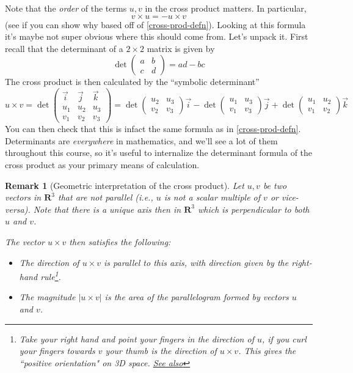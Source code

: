 \documentclass[12pt]{article}
\numberwithin{equation}{subsection}
\numberwithin{figure}{subsection}
\theoremstyle{note}
\newtheorem{remark}[subsection]{Remark}
\begin{document}
{Note that the \textit{order} of the terms $u,v$ in the cross product matters. In particular, \[ v\times u=- u \times v\] (see if you can show why based off of \eqref{cross-prod-defn}). Looking at this formula it's maybe not super obvious where this should come from. Let's unpack it. First recall that the determinant of a $2\times 2$ matrix is given by \[ \det\begin{pmatrix} a & b \\ c & d\end{pmatrix} =ad-bc\] The cross product is then calculated by the ``symbolic determinant'' \begin{equation} u\times v= \det \begin{pmatrix} \vec{i} & \vec{j} & \vec{k} \\ u_1 & u_2 & u_3 \\ v_1 & v_2 & v_3 \end{pmatrix} = 
\det\begin{pmatrix} u_2 & u_3 \\ v_2 & v_3 \end{pmatrix} \vec{i} 
- \det \begin{pmatrix} u_1 & u_3 \\ v_1 & v_3 \end{pmatrix} \vec{j} 
+ \det \begin{pmatrix} u_1 & u_2 \\ v_1 & v_2 \end{pmatrix} \vec{k} \end{equation}
You can then check that this is infact the same formula as in \eqref{cross-prod-defn}. Determinants are \textit{everywhere} in mathematics, and we'll see a lot of them throughout this course, so it's useful to internalize the determinant formula of the cross product as your primary means of calculation.

\begin{remark}[Geometric interpretation of the cross product]
Let $u,v$ be two vectors in $\mathbf{R}^3$ that are not parallel (i.e., $u$ is not a scalar multiple of $v$ or vice-versa). Note that there is a unique axis then in $\mathbf{R}^3$ which is perpendicular to both $u$ and $v$. 



The vector $u\times v$ then satisfies the following: 
\begin{itemize}
\item The direction of  $u\times v$ is parallel to this axis, with direction given by the \textit{right-hand rule}\footnote{Take your right hand and point your fingers in the direction of $u$, if you curl your fingers towards $v$ your thumb is the direction of $u\times v$. This gives the ``positive orientation" on 3D space. \href{https://en.wikipedia.org/wiki/Right-hand_rule}{See also} }.
\item The magnitude $|u\times v|$ is the area of the \textit{parallelogram} formed by vectors $u$ and $v$.
\end{itemize}


\end{remark}}
\end{document}

